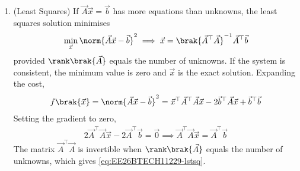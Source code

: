 \begin{enumerate}[label=\thesubsection.\arabic*, ref=\thesubsection.\theenumi]
\item (Least Squares) If $\vec{A}\vec{x} = \vec{b}$ has more equations than unknowns, the least squares solution minimises
\begin{align}
	\min_{\vec{x}}\norm{\vec{A}\vec{x} - \vec{b}}^2 \implies \vec{x} = \brak{\vec{A}^{\top}\vec{A}}^{-1}\vec{A}^{\top}\vec{b}
	\label{eq:EE26BTECH11229-lstsq}
\end{align}
provided $\rank\brak{\vec{A}}$ equals the number of unknowns. If the system is consistent, the minimum value is zero and $\vec{x}$ is the exact solution.
\solution
Expanding the cost,
\begin{align}
	f\brak{\vec{x}} = \norm{\vec{A}\vec{x} - \vec{b}}^2 = \vec{x}^{\top}\vec{A}^{\top}\vec{A}\vec{x} - 2\vec{b}^{\top}\vec{A}\vec{x} + \vec{b}^{\top}\vec{b}
\end{align}
Setting the gradient to zero,
\begin{align}
	2\vec{A}^{\top}\vec{A}\vec{x} - 2\vec{A}^{\top}\vec{b} = \vec{0} \implies \vec{A}^{\top}\vec{A}\vec{x} = \vec{A}^{\top}\vec{b}
\end{align}
The matrix $\vec{A}^{\top}\vec{A}$ is invertible when $\rank\brak{\vec{A}}$ equals the number of unknowns, which gives \eqref{eq:EE26BTECH11229-lstsq}.


\end{enumerate}
